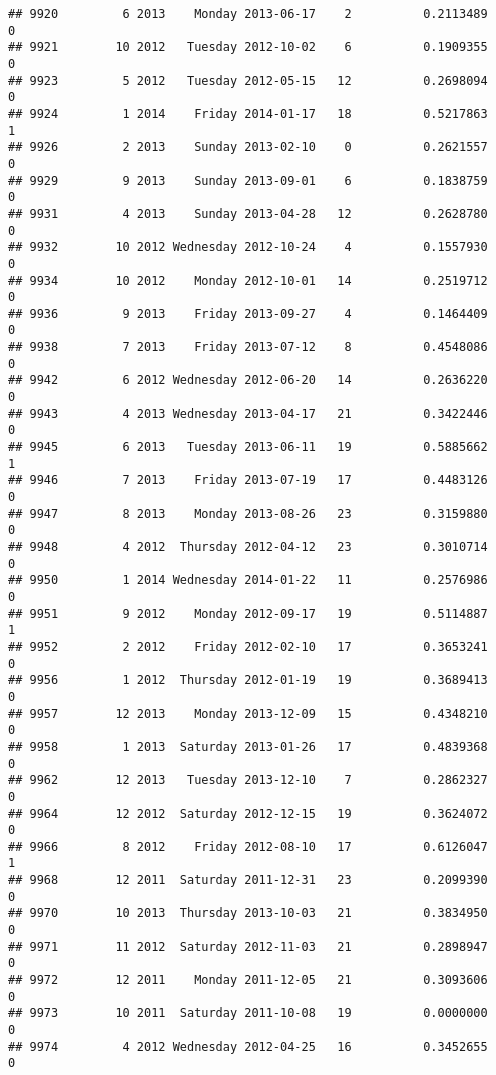 \documentclass[
]{article}
\begin{document}
\begin{verbatim}
## 9920         6 2013    Monday 2013-06-17    2          0.2113489             0
## 9921        10 2012   Tuesday 2012-10-02    6          0.1909355             0
## 9923         5 2012   Tuesday 2012-05-15   12          0.2698094             0
## 9924         1 2014    Friday 2014-01-17   18          0.5217863             1
## 9926         2 2013    Sunday 2013-02-10    0          0.2621557             0
## 9929         9 2013    Sunday 2013-09-01    6          0.1838759             0
## 9931         4 2013    Sunday 2013-04-28   12          0.2628780             0
## 9932        10 2012 Wednesday 2012-10-24    4          0.1557930             0
## 9934        10 2012    Monday 2012-10-01   14          0.2519712             0
## 9936         9 2013    Friday 2013-09-27    4          0.1464409             0
## 9938         7 2013    Friday 2013-07-12    8          0.4548086             0
## 9942         6 2012 Wednesday 2012-06-20   14          0.2636220             0
## 9943         4 2013 Wednesday 2013-04-17   21          0.3422446             0
## 9945         6 2013   Tuesday 2013-06-11   19          0.5885662             1
## 9946         7 2013    Friday 2013-07-19   17          0.4483126             0
## 9947         8 2013    Monday 2013-08-26   23          0.3159880             0
## 9948         4 2012  Thursday 2012-04-12   23          0.3010714             0
## 9950         1 2014 Wednesday 2014-01-22   11          0.2576986             0
## 9951         9 2012    Monday 2012-09-17   19          0.5114887             1
## 9952         2 2012    Friday 2012-02-10   17          0.3653241             0
## 9956         1 2012  Thursday 2012-01-19   19          0.3689413             0
## 9957        12 2013    Monday 2013-12-09   15          0.4348210             0
## 9958         1 2013  Saturday 2013-01-26   17          0.4839368             0
## 9962        12 2013   Tuesday 2013-12-10    7          0.2862327             0
## 9964        12 2012  Saturday 2012-12-15   19          0.3624072             0
## 9966         8 2012    Friday 2012-08-10   17          0.6126047             1
## 9968        12 2011  Saturday 2011-12-31   23          0.2099390             0
## 9970        10 2013  Thursday 2013-10-03   21          0.3834950             0
## 9971        11 2012  Saturday 2012-11-03   21          0.2898947             0
## 9972        12 2011    Monday 2011-12-05   21          0.3093606             0
## 9973        10 2011  Saturday 2011-10-08   19          0.0000000             0
## 9974         4 2012 Wednesday 2012-04-25   16          0.3452655             0

\end{verbatim}
\end{document}
